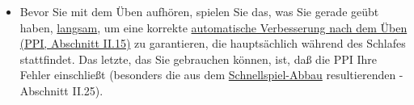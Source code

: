 \begin{itemize}
\item Bevor Sie mit dem Üben aufhören, spielen Sie das, was Sie gerade geübt haben, \hyperlink{c1ii17}{langsam}, um eine korrekte \hyperlink{c1ii15}{automatische Verbesserung nach dem Üben (PPI, Abschnitt II.15)} zu garantieren, die hauptsächlich während des Schlafes stattfindet.
Das letzte, das Sie gebrauchen können, ist, daß die PPI Ihre Fehler einschließt (besonders die aus dem \hyperlink{fpd}{Schnellspiel-Abbau} resultierenden - Abschnitt II.25).
 \end{itemize}




